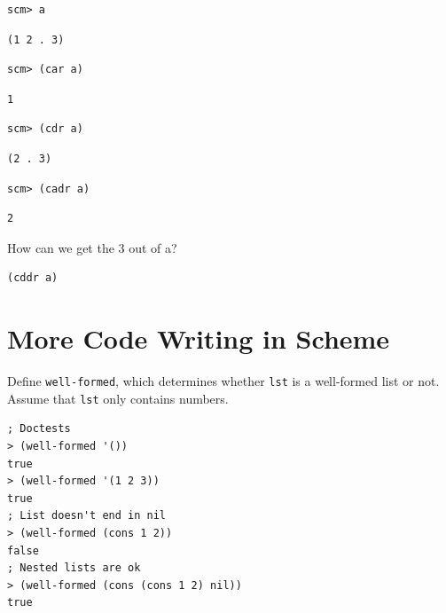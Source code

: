 \documentclass{exam}
\begin{document}
\begin{questions}
\begin{blocksection}
\begin{lstlisting}
scm> a
\end{lstlisting}
\begin{solution}[.25in]
\begin{lstlisting}
(1 2 . 3)
\end{lstlisting}
\end{solution}

\begin{lstlisting}
scm> (car a)
\end{lstlisting}
\begin{solution}[.25in]
\begin{lstlisting}
1
\end{lstlisting}
\end{solution}

\begin{lstlisting}
scm> (cdr a)
\end{lstlisting}
\begin{solution}[.25in]
\begin{lstlisting}
(2 . 3)
\end{lstlisting}
\end{solution}

\begin{lstlisting}
scm> (cadr a)
\end{lstlisting}
\begin{solution}[.25in]
\begin{lstlisting}
2
\end{lstlisting}
\end{solution}

How can we get the 3 out of a?
\begin{solution}[.25in]
\begin{lstlisting}
(cddr a)
\end{lstlisting}
\end{solution}
\end{blocksection}

\section{More Code Writing in Scheme}

\begin{blocksection}
\question Define \texttt{well-formed}, which determines whether \texttt{lst} is a well-formed list or not. Assume that \texttt{lst} only contains numbers.

\begin{lstlisting}
; Doctests
> (well-formed '())
true
> (well-formed '(1 2 3))
true
; List doesn't end in nil
> (well-formed (cons 1 2))
false
; Nested lists are ok
> (well-formed (cons (cons 1 2) nil))
true
\end{lstlisting}


\end{blocksection}
\end{questions}
\end{document}
